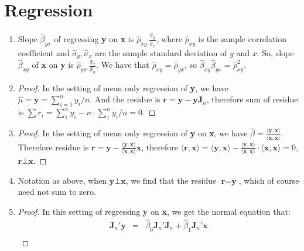 \documentclass[12pt]{article}
\begin{document}
\section{Regression}

\begin{enumerate}
    \item 
    Slope $\hat{\beta}_{yx}$ of regressing \textbf{y} on \textbf{x} is $\hat{\rho}_{xy}\ \frac{\hat{\sigma}_y}{\hat{\sigma}_x}$, where $\hat{\rho}_{xy}$ is the sample correlation coefficient and $\hat{\sigma}_y, \hat{\sigma}_x$ are the sample standard deviation of $y$ and $x$.
    So, slope $\hat{\beta}_{xy}$ of \textbf{x} on \textbf{y} is $\hat{\rho}_{yx}\ \frac{\hat{\sigma}_x}{\hat{\sigma}_y}$.
    We have that $\hat{\rho}_{xy} = \hat{\rho}_{yx}$, so $\hat{\beta}_{xy} \hat{\beta}_{yx} = \hat{\rho}_{xy}^2$.
    \item
    \begin{proof}
        In the setting of mean only regression of \textbf{y}, we have $\hat{\mu} = \overline{\textbf{y}} = \sum_{i=1}^n y_i / n$.
        And the residue is $\textbf{r} = \textbf{y} - \overline{\textbf{y}} \textbf{J}_n$, therefore sum of residue is $\sum r_i = \sum_1^n y_i - n \cdot \sum_1^n y_i / n = 0$.
    \end{proof}
    \item
    \begin{proof}
        In the setting of mean only regression of \textbf{y} on \textbf{x}, we have $\hat{\beta} = \frac{\langle \textbf{y}, \textbf{x} \rangle}{\langle \textbf{x}, \textbf{x} \rangle}$.
        Therefore residue is $\textbf{r} = \textbf{y} - \frac{\langle \textbf{y}, \textbf{x} \rangle}{\langle \textbf{x}, \textbf{x} \rangle} \textbf{x}$, therefore $\langle \textbf{r}, \textbf{x} \rangle = \langle \textbf{y}, \textbf{x} \rangle - \frac{\langle \textbf{y}, \textbf{x} \rangle}{\langle \textbf{x}, \textbf{x} \rangle}\cdot\langle \textbf{x}, \textbf{x} \rangle = 0$, $\textbf{r} \bot \textbf{x}$.
    \end{proof}
    \item
    Notation as above, when $\textbf{y} \bot \textbf{x}$, we find that the residue $\textbf{r} = \textbf{y}$, which of course need not sum to zero.
    \item
    \begin{proof}
        In this setting of regressing \textbf{y} on \textbf{x}, we get the normal equation that:
        \begin{eqnarray}
            \textbf{J}_n'\textbf{y} &=& \hat{\beta}_0 \textbf{J}_n'\textbf{J}_n + \hat{\beta}_1 \textbf{J}_n'\textbf{x} \\

\end{eqnarray}
\end{proof}
\end{enumerate}
\end{document}
